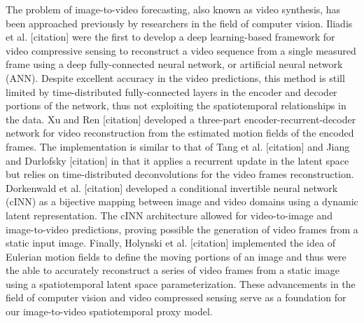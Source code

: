 \documentclass[default,iicol]{sn-jnl}
\begin{document}
The problem of image-to-video forecasting, also known as video synthesis, has been approached previously by researchers in the field of computer vision. Iliadis et al. [citation] were the first to develop a deep learning-based framework for video compressive sensing to reconstruct a video sequence from a single measured frame using a deep fully-connected neural network, or artificial neural network (ANN). Despite excellent accuracy in the video predictions, this method is still limited by time-distributed fully-connected layers in the encoder and decoder portions of the network, thus not exploiting the spatiotemporal relationships in the data. Xu and Ren [citation] developed a three-part encoder-recurrent-decoder network for video reconstruction from the estimated motion fields of the encoded frames. The implementation is similar to that of Tang et al. [citation] and Jiang and Durlofsky [citation] in that it applies a recurrent update in the latent space but relies on time-distributed deconvolutions for the video frames reconstruction. Dorkenwald et al. [citation] developed a conditional invertible neural network (cINN) as a bijective mapping between image and video domains using a dynamic latent representation. The cINN architecture allowed for video-to-image and image-to-video predictions, proving possible the generation of video frames from a static input image. Finally, Holynski et al. [citation] implemented the idea of Eulerian motion fields to define the moving portions of an image and thus were the able to accurately reconstruct a series of video frames from a static image using a spatiotemporal latent space parameterization. These advancements in the field of computer vision and video compressed sensing serve as a foundation for our image-to-video spatiotemporal proxy model.
\end{document}
